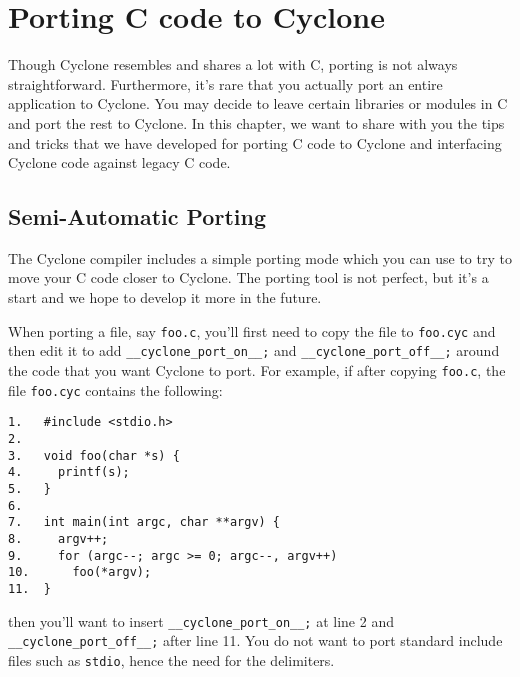 \section{Porting C code to Cyclone}

\ifscreen
\newenvironment{porta}[2]{%
  \begin{list}{}{}%
  \item[\hypertarget{#1}{\colorbox{lightblue}{\textbf{#2}}}]}{\end{list}}
\else
\newenvironment{porta}[2]{%
  \begin{list}{}{}%
  \item[\hypertarget{#1}{\textbf{#2}}]}{\end{list}}
\fi
Though Cyclone resembles and shares a lot with C, porting is not
always straightforward.  Furthermore, it's rare that you actually port
an entire application to Cyclone.  You may decide to leave certain
libraries or modules in C and port the rest to Cyclone.  In this
chapter, we want to share with you the tips and tricks that we have
developed for porting C code to Cyclone and interfacing Cyclone
code against legacy C code.

\subsection{Semi-Automatic Porting}

The Cyclone compiler includes a simple porting mode which you can
use to try to move your C code closer to Cyclone.  The porting
tool is not perfect, but it's a start and we hope to develop it
more in the future.  

When porting a file, say \texttt{foo.c}, you'll first need to
copy the file to \texttt{foo.cyc} and then edit it to
add \texttt{__cyclone_port_on__;} and 
\texttt{__cyclone_port_off__;} around the code that you want
Cyclone to port.  For example, if after copying \texttt{foo.c},
the file \texttt{foo.cyc} contains the
following:
\begin{verbatim}
1.   #include <stdio.h>
2. 
3.   void foo(char *s) {
4.     printf(s);
5.   }
6. 
7.   int main(int argc, char **argv) {
8.     argv++;
9.     for (argc--; argc >= 0; argc--, argv++)
10.      foo(*argv);
11.  }
\end{verbatim}
then you'll want to insert \texttt{__cyclone_port_on__;} at line
2 and \texttt{__cyclone_port_off__;} after line 11.  You do not
want to port standard include files such as \texttt{stdio}, hence
the need for the delimiters.

